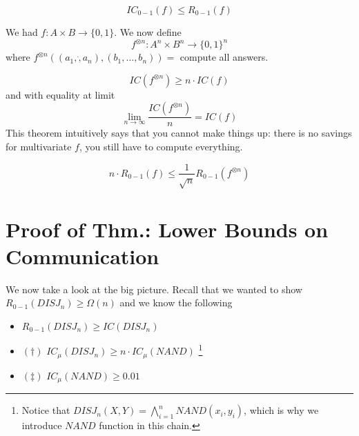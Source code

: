 \begin{proposition}
	\begin{equation}
		IC_{0-1}(f) \leq R_{0-1}(f)
	\end{equation}
\end{proposition}

\begin{definition}
	We had $f: A \times B \rightarrow \{0, 1\}$. We now define
	\begin{equation}
		f^{\otimes n}: A^n \times B^n \rightarrow \{0, 1\}^n
	\end{equation}
	where $f^{\otimes n} ((a_1, \dot, a_n), (b_1, \dots, b_n)) = $ compute all answers.  
\end{definition}

\begin{theorem}
	\begin{equation}
		IC(f^{\otimes n}) \geq n \cdot IC(f)
	\end{equation}
	and with equality at limit
	\begin{equation}
		\lim_{n \rightarrow \infty} \frac{IC(f^{\otimes n})}{n} = IC(f)
	\end{equation}
	This theorem intuitively says that you cannot make things up: there is no savings for multivariate $f$, you still have to compute everything. 
\end{theorem}

\begin{theorem}
	[BBCR10]
	\begin{equation}
		n \cdot R_{0 - 1}(f) \leq \frac{1}{\sqrt{n}} R_{0 - 1}(f^{\otimes n} ) 
	\end{equation}
\end{theorem}

\section{Proof of Thm.: Lower Bounds on Communication}
We now take a look at the big picture. Recall that we wanted to show $R_{0-1}(DISJ_n) \geq \Omega (n)$ and we know the following
\begin{itemize}
	\item $R_{0-1}(DISJ_n) \geq IC(DISJ_n)$
	\item $(\dagger)\,\, IC_\mu(DISJ_n) \geq n \cdot IC_\mu(NAND)$ \footnote{Notice that $DISJ_n(X, Y) = \bigwedge_{i = 1}^n NAND(x_i, y_i)$, which is why we introduce $NAND$ function in this chain. }
	\item $(\ddag)\,\, IC_\mu(NAND) \geq 0.01$
\end{itemize}

